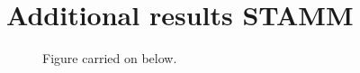 \chapter{Additional results STAMM}

\begin{figure}[h]
  \centering
\caption{Figure carried on below.}
\end{figure}

